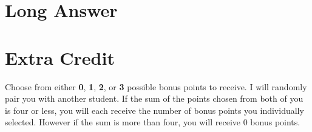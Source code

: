 \documentclass{article}
\begin{document}
\newpage

\section*{Long Answer}



\newpage



\section*{Extra Credit}
Choose from either \textbf{0}, \textbf{1}, \textbf{2}, or \textbf{3} possible bonus points to receive.
I will randomly pair you with another student. 
If the sum of the points chosen from both of you is four or less, you will each receive the number of bonus points you individually selected.
However if the sum is more than four, you will receive 0 bonus points.

\end{document}
